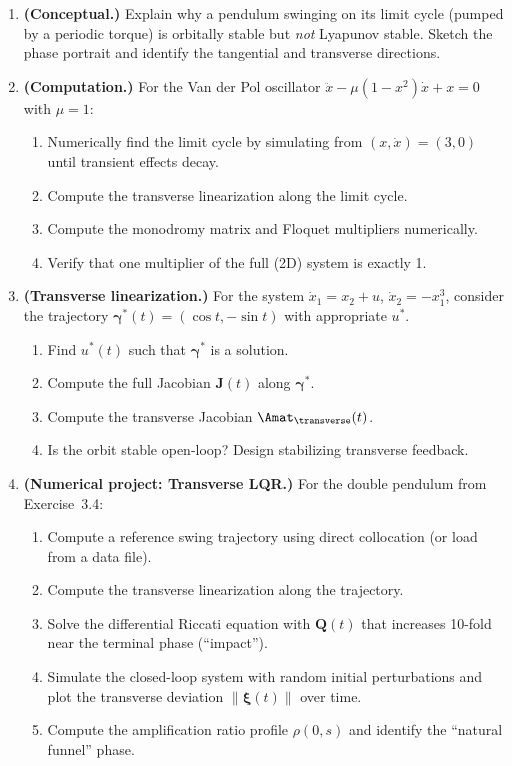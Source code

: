 \documentclass[12pt, openany]{book}
\theoremstyle{plain}
\newcommand{\traj}{\bm{\gamma}}
\newcommand{\norm}[1]{\left\lVert #1 \right\rVert}
\begin{document}
\begin{enumerate}[label=\textbf{4.\arabic*.}, leftmargin=1.5cm]

\item \textbf{(Conceptual.)} Explain why a pendulum swinging on its limit
  cycle (pumped by a periodic torque) is orbitally stable but \emph{not}
  Lyapunov stable. Sketch the phase portrait and identify the tangential
  and transverse directions.

\item \textbf{(Computation.)} For the Van der Pol oscillator
  $\ddot{x} - \mu(1 - x^2)\dot{x} + x = 0$ with $\mu = 1$:
  \begin{enumerate}[label=(\alph*)]
    \item Numerically find the limit cycle by simulating from
      $(x, \dot{x}) = (3, 0)$ until transient effects decay.
    \item Compute the transverse linearization along the limit cycle.
    \item Compute the monodromy matrix and Floquet multipliers numerically.
    \item Verify that one multiplier of the full (2D) system is exactly 1.
  \end{enumerate}

\item \textbf{(Transverse linearization.)} For the system
  $\dot{x}_1 = x_2 + u$, $\dot{x}_2 = -x_1^3$, consider the trajectory
  $\traj^*(t) = (\cos t, -\sin t)$ with appropriate $u^*$.
  \begin{enumerate}[label=(\alph*)]
    \item Find $u^*(t)$ such that $\traj^*$ is a solution.
    \item Compute the full Jacobian $\bm{J}(t)$ along $\traj^*$.
    \item Compute the transverse Jacobian $\Amat_\transverse(t)$.
    \item Is the orbit stable open-loop? Design stabilizing transverse feedback.
  \end{enumerate}

\item \textbf{(Numerical project: Transverse LQR.)} For the double pendulum
  from Exercise~3.4:
  \begin{enumerate}[label=(\alph*)]
    \item Compute a reference swing trajectory using direct collocation
      (or load from a data file).
    \item Compute the transverse linearization along the trajectory.
    \item Solve the differential Riccati equation with $\bm{Q}(t)$ that
      increases 10-fold near the terminal phase (``impact'').
    \item Simulate the closed-loop system with random initial perturbations
      and plot the transverse deviation $\norm{\bm{\xi}(t)}$ over time.
    \item Compute the amplification ratio profile $\rho(0, s)$ and identify
      the ``natural funnel'' phase.
  \end{enumerate}


\end{enumerate}
\end{document}
